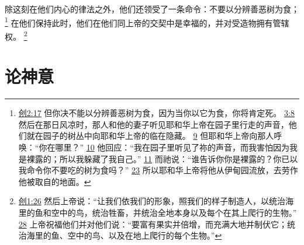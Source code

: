 \documentclass[12pt, a4paper, oneside]{ctexart}
\begin{document}
	除这刻在他们内心的律法之外，他们还领受了一条命令：不要以分辨善恶树为食；
	\footnote {
		\href{https://biblehub.com/genesis/2-17.htm}{创2:17} 但你决不能以分辨善恶树为食，因为当你以它为食，你将肯定死。
		\href{https://biblehub.com/genesis/3-8.htm}{3:8} 然后在那日风凉时，那人和他的妻子听见耶和华上帝在园子里行走的声音，他们就在园子的树丛中向耶和华上帝的临在隐藏。
		\href{https://biblehub.com/genesis/3-9.htm}{9} 但耶和华上帝向那人呼唤：“你在哪里？”
		\href{https://biblehub.com/genesis/3-10.htm}{10} 他回应：“我在园子里听见了祢的声音，而我害怕因为我是裸露的；所以我躲藏了我自己。”
		\href{https://biblehub.com/genesis/3-11.htm}{11} 而祂说：“谁告诉你你是裸露的？你已以我命令你不要吃的树为食吗？”
		\href{https://biblehub.com/genesis/3-23.htm}{23} 所以耶和华上帝将他从伊甸园流放，去劳作他被取自的地面。
	}
	在他们保持此时，他们在他们同上帝的交契中是幸福的，并对受造物拥有管辖权。
	\footnote {
		\href{https://biblehub.com/genesis/1-26.htm}{创1:26} 然后上帝说：“让我们依我们的形象，照我们的样子制造人，以统治海里的鱼和空中的鸟，统治牲畜，并统治全地本身以及每个在其上爬行的生物。”
		\href{https://biblehub.com/genesis/1-28.htm}{28} 上帝祝福他们并对他们说：“要富有果实并倍增，而充满大地并制伏它；统治海里的鱼、空中的鸟、以及在地上爬行的每个生物。”
	}

\section{论神意}
\end{document}
